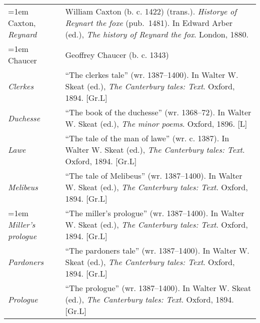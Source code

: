 \begin{xltabular}{\textwidth}{ lQ }
\hangindent=1em  Caxton, \textit{Reynard} & William Caxton (b. c. 1422) (trans.). \textit{Historye of Reynart the foxe} (pub.~1481). In Edward Arber (ed.), \textit{The history of Reynard the fox}. London, 1880.  \\

\hangindent=1em  Chaucer & Geoffrey Chaucer (b. c. 1343) \\
\hspace{1em}\textit{Clerkes} & ``The clerkes tale'' (wr. 1387--1400). In Walter W. Skeat (ed.), \textit{The Canterbury tales: Text}. Oxford, 1894. [Gr.L] \\ %
\hspace{1em}\textit{Duchesse} & ``The book of the duchesse'' (wr. 1368--72). In Walter W. Skeat (ed.), \textit{The minor poems}. Oxford, 1896. [L] \\ %
\hspace{1em}\textit{Lawe} & ``The tale of the man of lawe'' (wr. c. 1387). In Walter W. Skeat (ed.), \textit{The Canterbury tales: Text}. Oxford, 1894. [Gr.L] \\ %
\hspace{1em}\textit{Melibeus} & ``The tale of Melibeus'' (wr. 1387--1400). In Walter W. Skeat (ed.), \textit{The Canterbury tales: Text}. Oxford, 1894. [Gr.L] \\ %
\hspace{1em}\hangindent=1em  \textit{Miller's prologue} & ``The miller's prologue'' (wr. 1387--1400). In Walter W. Skeat (ed.), \textit{The Canterbury tales: Text}. Oxford, 1894. [Gr.L] \\ %
\hspace{1em}\textit{Pardoners} & ``The pardoners tale'' (wr. 1387--1400). In Walter W. Skeat (ed.), \textit{The Canterbury tales: Text}. Oxford, 1894. [Gr.L] \\ %
\hspace{1em}\textit{Prologue} & ``The prologue'' (wr. 1387--1400). In Walter W. Skeat (ed.), \textit{The Canterbury tales: Text}. Oxford, 1894. [Gr.L] \\ %


\end{xltabular}
